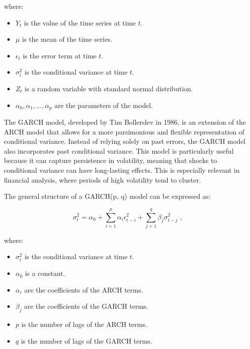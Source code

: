 where:
\begin{itemize}
    \item \( Y_t \) is the value of the time series at time \( t \).
    \item \( \mu \) is the mean of the time series.
    \item \( \epsilon_t \) is the error term at time \( t \).
    \item \( \sigma_t^2 \) is the conditional variance at time \( t \).
    \item \( Z_t \) is a random variable with standard normal distribution.
    \item \( \alpha_0, \alpha_1, \ldots, \alpha_p \) are the parameters of the model.
\end{itemize}

The GARCH model, developed by Tim Bollerslev in 1986, is an extension of the ARCH model that allows for a more parsimonious and flexible representation of conditional variance. Instead of relying solely on past errors, the GARCH model also incorporates past conditional variance. This model is particularly useful because it can capture persistence in volatility, meaning that shocks to conditional variance can have long-lasting effects. This is especially relevant in financial analysis, where periods of high volatility tend to cluster.

The general structure of a GARCH(p, q) model can be expressed as:

\begin{equation}
\sigma_t^2 = \alpha_0 + \sum_{i=1}^p \alpha_i \epsilon_{t-i}^2 + \sum_{j=1}^q \beta_j \sigma_{t-j}^2 \text{ ,}
\end{equation}

where:
\begin{itemize}
    \item \( \sigma_t^2 \) is the conditional variance at time \( t \).
    \item \( \alpha_0 \) is a constant.
    \item \( \alpha_i \) are the coefficients of the ARCH terms.
    \item \( \beta_j \) are the coefficients of the GARCH terms.
    \item \( p \) is the number of lags of the ARCH terms.
    \item \( q \) is the number of lags of the GARCH terms.
\end{itemize}
\vspace{10pt}



